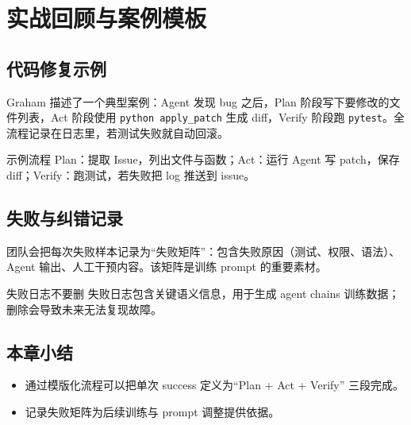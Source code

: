 \section{实战回顾与案例模板}
\subsection{代码修复示例}
Graham 描述了一个典型案例：Agent 发现 bug 之后，Plan 阶段写下要修改的文件列表，Act 阶段使用 \texttt{python apply\_patch} 生成 diff，Verify 阶段跑 \texttt{pytest}。全流程记录在日志里，若测试失败就自动回滚。

\begin{knowledgebox}{示例流程}
Plan：提取 Issue，列出文件与函数；Act：运行 Agent 写 patch，保存 diff；Verify：跑测试，若失败把 log 推送到 issue。
\end{knowledgebox}

\subsection{失败与纠错记录}
团队会把每次失败样本记录为“失败矩阵”：包含失败原因（测试、权限、语法）、Agent 输出、人工干预内容。该矩阵是训练 prompt 的重要素材。

\begin{warningbox}{失败日志不要删}
失败日志包含关键语义信息，用于生成 agent chains 训练数据；删除会导致未来无法复现故障。
\end{warningbox}

\subsection{本章小结}
\begin{itemize}
    \item 通过模版化流程可以把单次 success 定义为“Plan + Act + Verify” 三段完成。
    \item 记录失败矩阵为后续训练与 prompt 调整提供依据。
\end{itemize}

